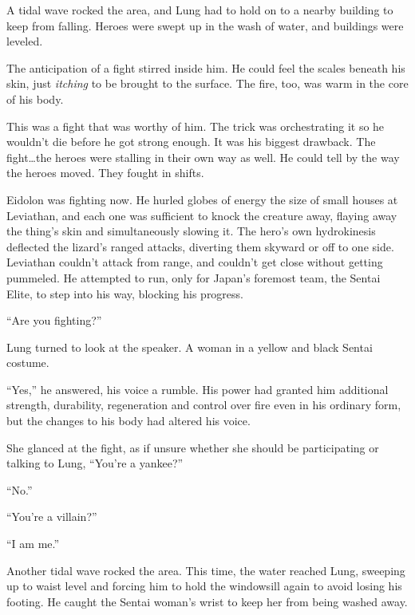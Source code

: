 A tidal wave rocked the area, and Lung had to hold on to a nearby building to keep from falling.  Heroes were swept up in the wash of water, and buildings were leveled.



The anticipation of a fight stirred inside him.  He could feel the scales beneath his skin, just \emph{itching} to be brought to the surface.  The fire, too, was warm in the core of his body.



This was a fight that was worthy of him.  The trick was orchestrating it so he wouldn't die before he got strong enough.  It was his biggest drawback.  The fight\ldots the heroes were stalling in their own way as well.  He could tell by the way the heroes moved.  They fought in shifts.



Eidolon was fighting now.  He hurled globes of energy the size of small houses at Leviathan, and each one was sufficient to knock the creature away, flaying away the thing's skin and simultaneously slowing it.  The hero's own hydrokinesis deflected the lizard's ranged attacks, diverting them skyward or off to one side.  Leviathan couldn't attack from range, and couldn't get close without getting pummeled.  He attempted to run, only for Japan's foremost team, the Sentai Elite, to step into his way, blocking his progress.



``Are you fighting?''



Lung turned to look at the speaker.  A woman in a yellow and black Sentai costume.



``Yes,'' he answered, his voice a rumble.  His power had granted him additional strength, durability, regeneration and control over fire even in his ordinary form, but the changes to his body had altered his voice.



She glanced at the fight, as if unsure whether she should be participating or talking to Lung, ``You're a yankee?''



``No.''



``You're a villain?''



``I am me.''



Another tidal wave rocked the area.  This time, the water reached Lung, sweeping up to waist level and forcing him to hold the windowsill again to avoid losing his footing.  He caught the Sentai woman's wrist to keep her from being washed away.



